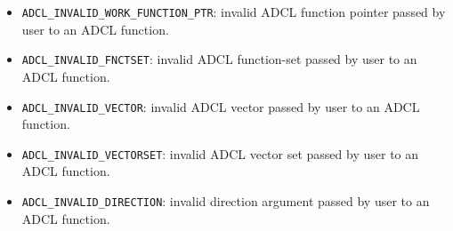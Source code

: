 \begin{itemize}
\item {\tt ADCL\_INVALID\_WORK\_FUNCTION\_PTR}: invalid ADCL function pointer passed by user to an ADCL function.
\item {\tt ADCL\_INVALID\_FNCTSET}: invalid ADCL function-set passed by user to an ADCL function.
\item {\tt ADCL\_INVALID\_VECTOR}: invalid ADCL vector passed by user to an ADCL function.
\item {\tt ADCL\_INVALID\_VECTORSET}: invalid ADCL vector set passed by user to an ADCL function.
\item {\tt ADCL\_INVALID\_DIRECTION}: invalid direction argument passed by user to an ADCL function.
\end{itemize}